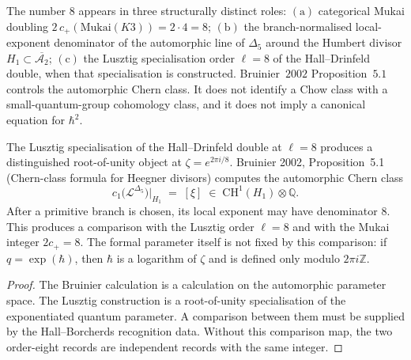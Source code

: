 \begin{remark}
\label{rem:qca-three-faces-of-eight}
The number $8$ appears in three structurally distinct roles: $(\mathrm{a})$ categorical Mukai doubling $2\,c_+(\mathrm{Mukai}(K3))=2\cdot 4 = 8$; $(\mathrm{b})$ the branch-normalised local-exponent denominator of the automorphic line of $\Delta_5$ around the Humbert divisor $H_1\subset\overline{\mathcal{A}_2}$; $(\mathrm{c})$ the Lusztig specialisation order $\ell=8$ of the Hall--Drinfeld double, when that specialisation is constructed. Bruinier~$2002$ Proposition~$5.1$ controls the automorphic Chern class. It does not identify a Chow class with a small-quantum-group cohomology class, and it does not imply a canonical equation for $\hbar^2$.
\end{remark}

\begin{theorem}[Root-of-unity comparison at \texorpdfstring{$\ell=8$}{l=8}]
\label{thm:qca-hbar-minus-eighth-lusztig}
The Lusztig specialisation of the Hall--Drinfeld double at $\ell=8$ produces a
distinguished root-of-unity object at $\zeta = e^{2\pi i/8}$. Bruinier 2002, Proposition~5.1
(Chern-class formula for Heegner divisors) computes the automorphic Chern class
\[
 c_1\bigl(\mathcal{L}^{\Delta_5}\bigr)\big|_{H_1}
 \;=\;
 [\xi]
 \;\in\;
 \mathrm{CH}^1(H_1)\otimes\mathbb{Q}.
\]
After a primitive branch is chosen, its local exponent may have denominator $8$. This produces a comparison with the Lusztig order $\ell=8$ and with the Mukai integer $2c_+=8$. The formal parameter itself is not fixed by this comparison: if $q=\exp(\hbar)$, then $\hbar$ is a logarithm of $\zeta$ and is defined only modulo $2\pi i\mathbb{Z}$.
\end{theorem}

\begin{proof}
The Bruinier calculation is a calculation on the automorphic parameter space. The Lusztig construction is a root-of-unity specialisation of the exponentiated quantum parameter. A comparison between them must be supplied by the Hall--Borcherds recognition data. Without this comparison map, the two order-eight records are independent records with the same integer.
\end{proof}

